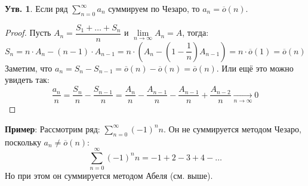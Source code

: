 \documentclass[12pt]{article}
\theoremstyle{definition}
\newtheorem{prop}{Утв.}
\newcommand{\ddsum}[2]{\displaystyle\sum\limits_{#1}^{#2}}
\begin{document}
\begin{prop}
	Если ряд $\ddsum{n = 0}{\infty}a_n$ суммируем по Чезаро, то $a_n = \overline{o}(n)$.	 
\end{prop}
\begin{proof}
	Пусть $A_n = \dfrac{S_1 + \dotsc + S_n}{n}$ и $\lim\limits_{n \to \infty}A_n = A$, тогда: 
	$$
		S_n = n{\cdot}A_n - (n-1){\cdot}A_{n-1} = n {\cdot}\left(A_n -\left(1 - \dfrac{1}{n}\right)A_{n-1}\right) = n{\cdot}\overline{o}(1) = \overline{o}(n)
	$$
	Заметим, что $a_n = S_n - S_{n-1} = \overline{o}(n) - \overline{o}(n) = \overline{o}(n)$. Или ещё это можно увидеть так:
	$$
		\dfrac{a_n}{n} = \dfrac{S_n}{n} - \dfrac{S_{n-1}}{n} = \dfrac{A_n}{n} - \dfrac{A_{n-1}}{n} - \dfrac{A_{n-1}}{n} + \dfrac{A_{n-2}}{n} \xrightarrow[n \to \infty]{} 0
	$$
\end{proof}
\textbf{Пример}: Рассмотрим ряд: $\ddsum{n = 0}{\infty}(-1)^n n$. Он не суммируется методом Чезаро, поскольку $a_n \neq \overline{o}(n)$:
$$
	\ddsum{n = 0}{\infty}(-1)^n n = -1 + 2 - 3 + 4 - \dotsc
$$
Но при этом он суммируется методом Абеля (см. выше).
\end{document}
